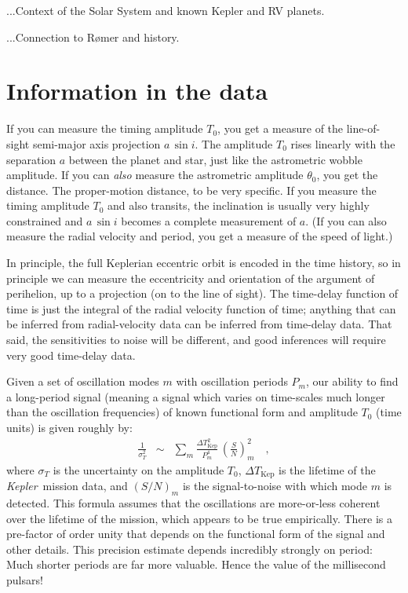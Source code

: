 \documentclass[12pt, preprint]{aastex}
\newcommand{\project}[1]{\textsl{#1}}
\newcommand{\Kepler}{\project{Kepler}}
\newcommand{\DeltaTKepler}{\Delta T_{\mathrm{Kep}}}
\begin{document}
...Context of the Solar System and known Kepler and RV planets.

...Connection to R\o mer and history.

\section{Information in the data}

If you can measure the timing amplitude $T_0$, you get a measure of
the line-of-sight semi-major axis projection $a\,\sin i$.
The amplitude $T_0$ rises linearly with the separation $a$ between the
planet and star, just like the astrometric wobble amplitude.
If you can \emph{also} measure the astrometric amplitude $\theta_0$,
you get the distance.
The proper-motion distance, to be very specific.
If you measure the timing amplitude $T_0$ and also transits, the
inclination is usually very highly constrained and $a\,\sin i$ becomes
a complete measurement of $a$.
(If you can also measure the radial velocity and period, you get a
measure of the speed of light.)

In principle, the full Keplerian eccentric orbit is encoded in the
time history, so in principle we can measure the eccentricity and
orientation of the argument of perihelion, up to a projection (on to
the line of sight).
The time-delay function of time is just the integral of the radial
velocity function of time; anything that can be inferred from
radial-velocity data can be inferred from time-delay data.
That said, the sensitivities to noise will be different, and good
inferences will require very good time-delay data.

Given a set of oscillation modes $m$ with oscillation periods $P_m$,
our ability to find a long-period signal (meaning a signal which
varies on time-scales much longer than the oscillation frequencies) of
known functional form and amplitude $T_0$ (time units) is given
roughly by:
\begin{eqnarray}
\frac{1}{\sigma_T^2} &\sim& \sum_m \frac{\DeltaTKepler^2}{P_m^4}\,\left(\frac{S}{N}\right)_m^2
\quad ,
\end{eqnarray}
where $\sigma_T$ is the uncertainty on the amplitude $T_0$,
$\DeltaTKepler$ is the lifetime of the \Kepler\ mission data, and
$(S/N)_m$ is the signal-to-noise with which mode $m$ is detected.
This formula assumes that the oscillations are more-or-less coherent
over the lifetime of the mission, which appears to be true
empirically.
There is a pre-factor of order unity that depends on the functional
form of the signal and other details.
This precision estimate depends incredibly strongly on period:
Much shorter periods are far more valuable.
Hence the value of the millisecond pulsars!
\end{document}
